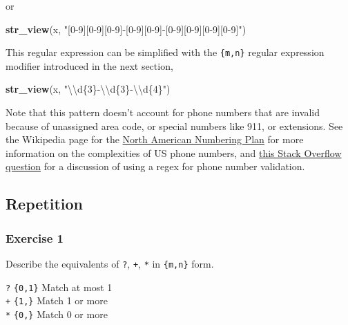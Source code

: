 \documentclass[]{book}
\newenvironment{Shaded}{\begin{snugshade}}{\end{snugshade}}
\newcommand{\CharTok}[1]{\textcolor[rgb]{0.31,0.60,0.02}{#1}}
\newcommand{\KeywordTok}[1]{\textcolor[rgb]{0.13,0.29,0.53}{\textbf{#1}}}
\newcommand{\NormalTok}[1]{#1}
\newcommand{\StringTok}[1]{\textcolor[rgb]{0.31,0.60,0.02}{#1}}
\theoremstyle{plain}
\theoremstyle{remark}
\theoremstyle{definition}
\theoremstyle{definition}
\theoremstyle{definition}
\theoremstyle{remark}
\begin{document}
or

\begin{Shaded}
\begin{Highlighting}[]
\KeywordTok{str_view}\NormalTok{(x, }\StringTok{"[0-9][0-9][0-9]-[0-9][0-9]-[0-9][0-9][0-9][0-9]"}\NormalTok{)}
\end{Highlighting}
\end{Shaded}

This regular expression can be simplified with the \texttt{\{m,n\}}
regular expression modifier introduced in the next section,

\begin{Shaded}
\begin{Highlighting}[]
\KeywordTok{str_view}\NormalTok{(x, }\StringTok{"}\CharTok{\textbackslash{}\textbackslash{}}\StringTok{d\{3\}-}\CharTok{\textbackslash{}\textbackslash{}}\StringTok{d\{3\}-}\CharTok{\textbackslash{}\textbackslash{}}\StringTok{d\{4\}"}\NormalTok{)}
\end{Highlighting}
\end{Shaded}

Note that this pattern doesn't account for phone numbers that are
invalid because of unassigned area code, or special numbers like 911, or
extensions. See the Wikipedia page for the
\href{https://en.wikipedia.org/wiki/North_American_Numbering_Plan}{North
American Numbering Plan} for more information on the complexities of US
phone numbers, and
\href{http://stackoverflow.com/questions/123559/a-comprehensive-regex-for-phone-number-validation}{this
Stack Overflow question} for a discussion of using a regex for phone
number validation.

\hypertarget{repetition}{%
\subsection{Repetition}\label{repetition}}

\hypertarget{exercise-1-34}{%
\subsubsection{Exercise 1}\label{exercise-1-34}}

Describe the equivalents of \texttt{?}, \texttt{+}, \texttt{*} in
\texttt{\{m,n\}} form.

\texttt{?} \textbar{} \texttt{\{0,1\}} \textbar{} Match at most 1\\
\texttt{+} \textbar{} \texttt{\{1,\}} \textbar{} Match 1 or more\\
\texttt{*} \textbar{} \texttt{\{0,\}} \textbar{} Match 0 or more
\end{document}
